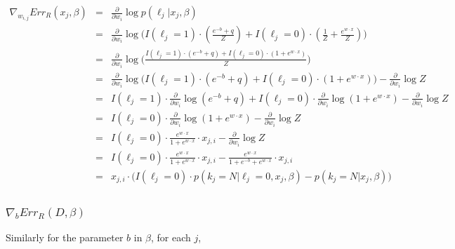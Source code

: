 \documentclass{article}
\begin{document}
\begin{eqnarray*}
\nabla_{w_{i,j}}{Err_R (x_j, \beta)} &=& \frac{\partial}{\partial w_i}\log{p(\ell_j | x_j, \beta)} \\
 &=& \frac{\partial}{\partial w_i}
		\log{\Bigg(
			I(\ell_j=1) \cdot \left( \frac{e^{-b} + q}{Z} \right) + 
			I(\ell_j=0) \cdot \left(\frac{1}{Z} + \frac{e^{w \cdot x}}{Z} \right)
		\Bigg)} \\
 &=& \frac{\partial}{\partial w_i}
		\log{\Bigg(
		    \frac{
			I(\ell_j=1) \cdot \left( e^{-b} + q \right) + 
			I(\ell_j=0) \cdot \left(1 + e^{w \cdot x} \right)
		     }{Z}
		\Bigg)} \\
 &=& \frac{\partial}{\partial w_i}
		\log{\bigg(
			I(\ell_j=1) \cdot \left( e^{-b} + q \right) +
			I(\ell_j=0) \cdot \left( 1 + e^{w \cdot x} \right)
		\bigg)}
		- \frac{\partial}{\partial w_i}
		 \log{Z} \\
 &=& I(\ell_j=1) \cdot \frac{\partial}{\partial w_i}
		\log{(e^{-b} + q)} +
    I(\ell_j=0) \cdot \frac{\partial}{\partial w_i}
		\log{ \left( 1 + e^{w \cdot x} \right) }
		- \frac{\partial}{\partial w_i}
		 \log{Z} \\
 &=& I(\ell_j=0) \cdot \frac{\partial}{\partial w_i}
		\log{  \left( 1 + e^{w \cdot x} \right) }
		- \frac{\partial}{\partial w_i}
		 \log{Z} \\
 &=& I(\ell_j=0) \cdot 
 		\frac{
			e^{w \cdot x}
		}{
			1 + e^{w \cdot x}
		} \cdot x_{j,i}
		- \frac{\partial}{\partial w_i}
		 \log{Z} \\
 &=& I(\ell_j=0) \cdot 
 		\frac{
			e^{w \cdot x}
		}{
			1 + e^{w \cdot x}
		} \cdot x_{j,i}
		- \frac{e^{w \cdot x}}{
			1 + e^{-b} + e^{w \cdot x}
		} \cdot x_{j,i} \\
 &=& x_{j,i} \cdot
    \big(	I(\ell_j=0) \cdot p(k_j=N | \ell_j=0, x_j, \beta) - 
		p(k_j=N | x_j, \beta)
    \big) \\
\end{eqnarray*}

\subsubsection{$ \nabla_{b}{Err_R (D, \beta)}$}

Similarly for the parameter $b$ in $\beta$, for each $j$,
\end{document}
